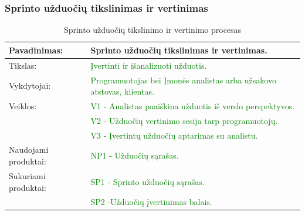 \documentclass{VUMIFPSkursinis}
\begin{document}
	\subsubsection{Sprinto užduočių tikslinimas ir vertinimas}
	\begin{center}
		\begin{table}[ht]
			\caption{Sprinto užduočių tikslinimo ir vertinimo procesas}
			\begin{tabular}{ | l | l | }
				\hline
				Pavadinimas:		& Sprinto užduočių tikslinimas ir vertinimas.				\\ \hline
				Tikslas: 		& \textcolor{green}{Įvertinti ir išanalizuoti užduotis.}					\\ \hline
				Vykdytojai:		& \textcolor{green}{Programuotojas bei Įmonės analistas arba užsakovo atstovas, klientas.}	\\ \hline
				Veiklos:		& \textcolor{green}{V1 - Analistas paaiškina užduotis iš verslo perspektyvos. }		\\
							& \textcolor{green}{V2 - Užduočių vertinimo sesija tarp programuotojų.	}		\\
							& \textcolor{green}{V3 - Įvertintų užduočių aptarimas su analistu. }			\\ \hline
				Naudojami produktai:	& \textcolor{green}{NP1 - Užduočių sąrašas. }						\\ \hline
				Sukuriami produktai:	& \textcolor{green}{SP1 - Sprinto užduočių sąrašas.} 					\\
							& \textcolor{green}{SP2 -Užduočių įvertinimas balais.	}				\\ \hline
			\end{tabular}
		\end{table}
	\end{center}
\end{document}
